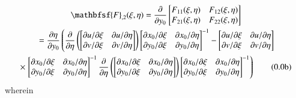 \begin{multline}
\mathbfsf{F}_{,2} (\xi, \eta) = \frac{\partial}{\partial y_0}
\begin{bmatrix}
F_{11}(\xi, \eta) & F_{12}(\xi, \eta) \\
F_{21}(\xi, \eta) & F_{22}(\xi, \eta)
\end{bmatrix} \\ 
\mbox{} = \frac{\partial \eta}{\partial y_0} \left(
\frac{\partial}{\partial \eta} \left(
\begin{bmatrix}
\partial u / \partial \xi & \partial u / \partial \eta \\
\partial v / \partial \xi & \partial v / \partial \eta
\end{bmatrix} \right)
\begin{bmatrix}
\partial x_0 / \partial \xi & \partial x_0 / \partial \eta \\
\partial y_0 / \partial \xi & \partial y_0 / \partial \eta
\end{bmatrix}^{-1} -
\begin{bmatrix}
\partial u / \partial \xi & \partial u / \partial \eta \\
\partial v / \partial \xi & \partial v / \partial \eta
\end{bmatrix} \right. \\ \times \left.
\begin{bmatrix}
\partial x_0 / \partial \xi & \partial x_0 / \partial \eta \\
\partial y_0 / \partial \xi & \partial y_0 / \partial \eta
\end{bmatrix}^{-1}
\frac{\partial}{\partial \eta} \left(
\begin{bmatrix}
\partial x_0 / \partial \xi & \partial x_0 / \partial \eta \\
\partial y_0 / \partial \xi & \partial y_0 / \partial \eta
\end{bmatrix} \right)
\begin{bmatrix}
\partial x_0 / \partial \xi & \partial x_0 / \partial \eta \\
\partial y_0 / \partial \xi & \partial y_0 / \partial \eta
\end{bmatrix}^{-1} \right)
\tag{\theequation b}
\end{multline}
wherein
